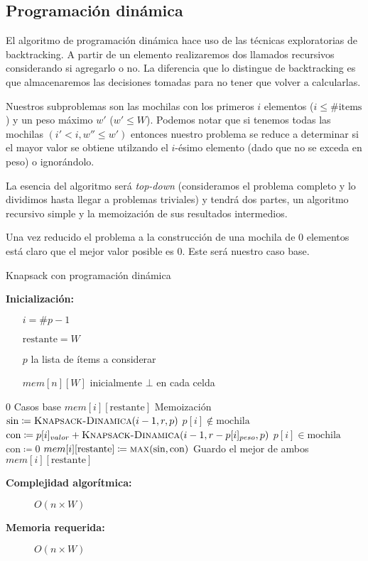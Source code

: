 \documentclass[fleqn, 11pt]{article}
\def\is{\coloneqq}
\begin{document}
\subsection{Programación dinámica}

El algoritmo de programación dinámica hace uso de las técnicas exploratorias de
backtracking. A partir de un elemento realizaremos dos llamados recursivos
considerando si agregarlo o no. La diferencia que lo distingue de backtracking
es que almacenaremos las decisiones tomadas para no tener que volver a
calcularlas.

Nuestros subproblemas son las mochilas con los primeros $i$ elementos ($i \le
\#\text{items}$) y un peso máximo $w'$ ($w' \le W$). Podemos notar que si
tenemos todas las mochilas $(i' < i, w'' \le w')$ entonces nuestro problema se
reduce a determinar si el mayor valor se obtiene utilzando el $i$-ésimo
elemento (dado que no se exceda en peso) o ignorándolo.

La esencia del algoritmo será \emph{top-down} (consideramos el problema
completo y lo dividimos hasta llegar a problemas triviales) y tendrá dos
partes, un algoritmo recursivo simple y la memoización de sus resultados
intermedios.

Una vez reducido el problema a la construcción de una mochila de $0$ elementos
está claro que el mejor valor posible es $0$. Este será nuestro caso base.

\begin{algorithm}
\caption{Knapsack con programación dinámica}
\begin{algorithmic}[1]
\item[\textbf{Inicialización:}]
\item[] \begin{itemize}
	\item[] $i = \#p - 1$
	\item[] $\text{restante} = W$
	\item[] $p$ la lista de ítems a considerar
	\item[] $mem[n][W]$ inicialmente $\bot$ en cada celda
\end{itemize}
\Statex
{}
	\State \Return $0$
\Comment Casos base
\EndIf
{}
	\State	\Return $mem[i][\text{restante}]$
	\Comment Memoización
\EndIf
\State $\text{sin} \is \Call{Knapsack-Dinamica}{i - 1, r, p}$
\Comment $p[i] \not \in \text{mochila}$
	\State $\text{con} \is p[i]_{valor} + \Call{Knapsack-Dinamica}{i - 1, r - p[i]_{peso}, p}$
	\Comment $p[i] \in \text{mochila}$
\Else
	\State $\text{con} \is 0$
\EndIf
\State $mem[i][\text{restante}] \is \Call{max}{\text{sin}, \text{con}}$
\Comment Guardo el mejor de ambos
\State \Return $mem[i][\text{restante}]$
\EndFunction
\end{algorithmic}
\begin{description}
	\item[\textbf{Complejidad algorítmica:}] $O(n \times W)$
	\item[\textbf{Memoria requerida:}] $O(n \times W)$
\end{description}
\end{algorithm}
\end{document}
